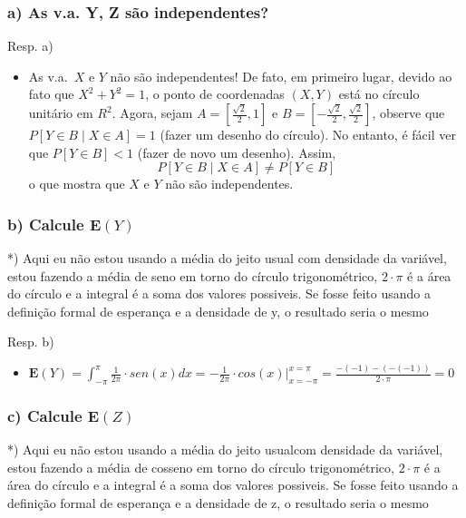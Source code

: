 \documentclass[portuguese]{article}
\begin{document}
\subsubsection*{\textmd{a) As v.a. Y, Z são independentes? }}

Resp. a)
\begin{itemize}
\item As v.a.~$X$ e $Y$ n\~ao s\~ao independentes! De fato, em primeiro lugar, devido ao fato que $X^2+Y^2=1$, o ponto de coordenadas $(X,Y)$ est\'a no c\'irculo unit\'ario em $R^2$. Agora, sejam $A=[\frac{\sqrt{2}}{2},1]$ e $B=[-\frac{\sqrt{2}}{2}, \frac{\sqrt{2}}{2}]$, observe que $P[Y\in B\mid X\in A]=1$ (fazer um desenho do c\'irculo). No entanto, \'e f\'acil ver que $P[Y\in B]<1$ (fazer de novo um desenho). Assim, 
$$P[Y\in B\mid X\in A] \neq P[Y\in B]$$
 o que mostra que $X$  e $Y$ n\~ao s\~ao independentes.
\end{itemize}

\subsubsection*{\textmd{b) Calcule $\mathbf{E}(Y)$}}

{*}) Aqui eu não estou usando a média do jeito usual com densidade
da variável, estou fazendo a média de seno em torno do círculo trigonométrico,
$2\cdot\pi$ é a área do círculo e a integral é a soma dos valores
possiveis. Se fosse feito usando a definição formal de esperança e
a densidade de y, o resultado seria o mesmo



Resp. b)
\begin{itemize}
\item $\mathbf{E}(Y)=\int_{-\pi}^{\pi}\frac{1}{2\pi}\cdot sen(x)dx=-\frac{1}{2\pi}\cdot cos(x)|_{x=-\pi}^{x=\pi}=\frac{-(-1)-(-(-1))}{2\cdot\pi}=0$
\end{itemize}

\subsubsection*{\textmd{c) Calcule $\mathbf{E}(Z)$}}

{*}) Aqui eu não estou usando a média do jeito usualcom densidade
da variável, estou fazendo a média de cosseno em torno do círculo
trigonométrico, $2\cdot\pi$ é a área do círculo e a integral é a
soma dos valores possiveis. Se fosse feito usando a definição formal
de esperança e a densidade de z, o resultado seria o mesmo
\end{document}
